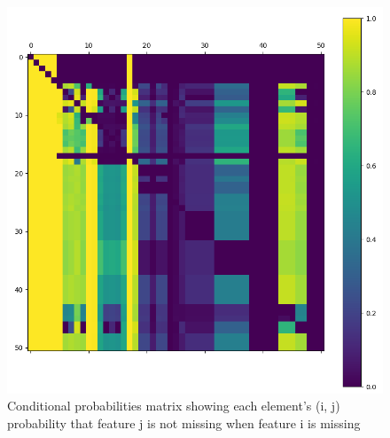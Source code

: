 \documentclass[11pt]{article}
\begin{document}
        \begin{figure}
          \centering
          \caption{Conditional probabilities matrix showing each element's (i, j) probability that feature j is not missing when feature i is missing}
          \label{figure:cond_prob_matrix}
          \includegraphics[scale=0.6]{thesis_res/cond/heatmap_cropped.png}
        \end{figure}
  \newpage
\end{document}
